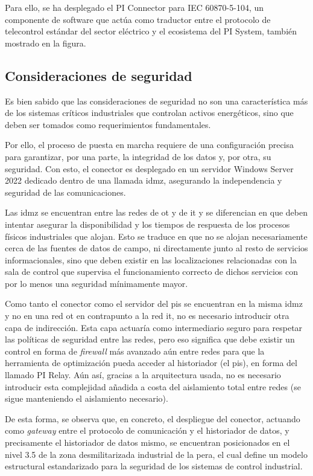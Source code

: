 Para ello, se ha desplegado el PI Connector para IEC 60870{-}5{-}104, un componente de software que actúa como traductor entre el protocolo de telecontrol estándar del sector eléctrico y el ecosistema del PI System, también mostrado en la figura.

\subsection{Consideraciones de seguridad}%
\label{makereference3.4.2}

Es bien sabido que las consideraciones de seguridad no son una característica más de los sistemas críticos industriales que controlan activos energéticos, sino que deben ser tomados como requerimientos fundamentales.

Por ello, el proceso de puesta en marcha requiere de una configuración precisa para garantizar, por una parte, la integridad de los datos y, por otra, su seguridad. Con esto, el conector es desplegado en un servidor Windows Server 2022 dedicado dentro de una llamada \gls{idmz}, asegurando la independencia y seguridad de las comunicaciones.

Las \gls{idmz} se encuentran entre las redes de \gls{ot} y de \gls{it} y se diferencian en que deben intentar asegurar la disponibilidad y los tiempos de respuesta de los procesos físicos industriales que alojan. Esto se traduce en que no se alojan necesariamente cerca de las fuentes de datos de campo, ni directamente junto al resto de servicios informacionales, sino que deben existir en las localizaciones relacionadas con la sala de control que supervisa el funcionamiento correcto de dichos servicios con por lo menos una seguridad mínimamente mayor.

Como tanto el conector como el servidor del \gls{pis} se encuentran en la misma \gls{idmz} y no en una red \gls{ot} en contrapunto a la red \gls{it}, no es necesario introducir otra capa de indirección. Esta capa actuaría como intermediario seguro para respetar las políticas de seguridad entre las redes, pero eso significa que debe existir un control en forma de \textit{firewall} más avanzado aún entre redes para que la herramienta de optimización pueda acceder al historiador (el \gls{pis}), en forma del llamado PI Relay. Aún así, gracias a la arquitectura usada, no es necesario introducir esta complejidad añadida a costa del aislamiento total entre redes (se sigue manteniendo el aislamiento necesario).

De esta forma, se observa que, en concreto, el despliegue del conector, actuando como \textit{gateway} entre el protocolo de comunicación y el historiador de datos, y precisamente el historiador de datos mismo, se encuentran posicionados en el nivel 3.5 de la zona desmilitarizada industrial de la \gls{pera}, el cual define un modelo estructural estandarizado para la seguridad de los sistemas de control industrial.

